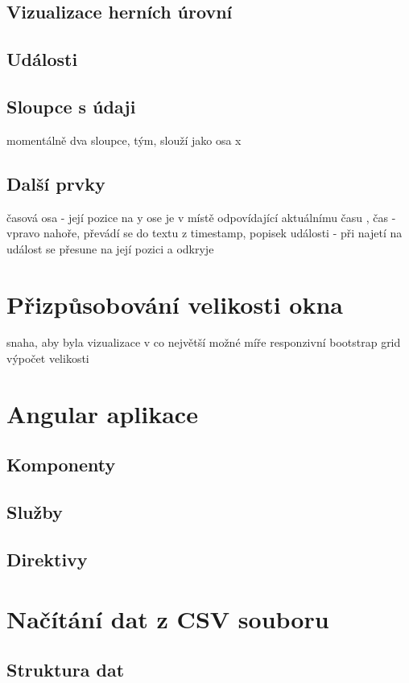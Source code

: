 \documentclass[
  digital, %
  oneside, %
  table,   %
  nolof,     %
  nolot,     %
]{fithesis3}
\begin{document}
\subsection{Vizualizace herních úrovní}
\subsection{Události}
\subsection{Sloupce s údaji}
momentálně dva sloupce, tým, slouží jako osa x
\subsection{Další prvky}
časová osa - její pozice na y ose je v místě odpovídající aktuálnímu času , čas - vpravo nahoře, převádí se do textu z timestamp, popisek události - při najetí na událost se přesune na její pozici a odkryje

\section{Přizpůsobování velikosti okna}
snaha, aby byla vizualizace v co největší možné míře responzivní
bootstrap grid
výpočet velikosti

\section{Angular aplikace}
\subsection{Komponenty}
\subsection{Služby}
\subsection{Direktivy}

\section{Načítání dat z CSV souboru}
\subsection{Struktura dat}
\end{document}
